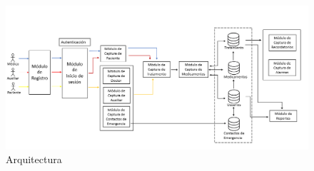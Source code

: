 \begin{figure}[htb]
	\centering
	\includegraphics[width=1\textwidth]{images/cap2/Arquitectura}
	\caption{Arquitectura} \label{fig:arquitectura}
\end{figure}

